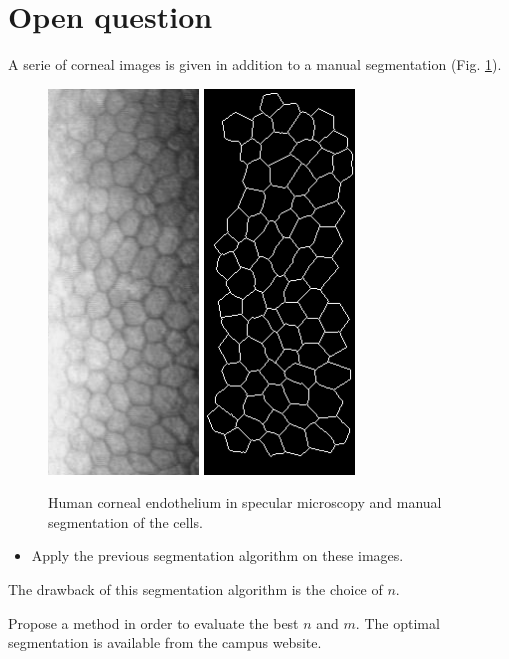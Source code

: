 \section{Open question}
A serie of corneal images is given in addition to a manual segmentation (Fig. \ref{fig:endothelium}). 
\begin{figure}[htbp]
 \centering
 \includegraphics[width=4cm]{10.png}
 \includegraphics[width=4cm]{expert_10.png}
 \caption{Human corneal endothelium in specular microscopy and manual segmentation of the cells.}
 \label{fig:endothelium}
\end{figure}


\begin{qbox}
 \begin{itemize}
  \item Apply the previous segmentation algorithm on these images.
 \end{itemize}
\end{qbox}

The drawback of this segmentation algorithm is the choice of $n$. 
\begin{qbox}
Propose a method in order to evaluate the best $n$ and $m$. The optimal segmentation is available from the campus website.
\end{qbox}

